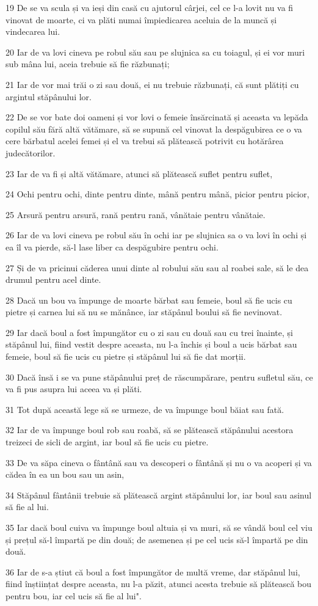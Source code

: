 \par 19 De se va scula și va ieși din casă cu ajutorul cârjei, cel ce l-a lovit nu va fi vinovat de moarte, ci va plăti numai împiedicarea aceluia de la muncă și vindecarea lui.
\par 20 Iar de va lovi cineva pe robul său sau pe slujnica sa cu toiagul, și ei vor muri sub mâna lui, aceia trebuie să fie răzbunați;
\par 21 Iar de vor mai trăi o zi sau două, ei nu trebuie răzbunați, că sunt plătiți cu argintul stăpânului lor.
\par 22 De se vor bate doi oameni și vor lovi o femeie însărcinată și aceasta va lepăda copilul său fără altă vătămare, să se supună cel vinovat la despăgubirea ce o va cere bărbatul acelei femei și el va trebui să plătească potrivit cu hotărârea judecătorilor.
\par 23 Iar de va fi și altă vătămare, atunci să plătească suflet pentru suflet,
\par 24 Ochi pentru ochi, dinte pentru dinte, mână pentru mână, picior pentru picior,
\par 25 Arsură pentru arsură, rană pentru rană, vânătaie pentru vânătaie.
\par 26 Iar de va lovi cineva pe robul său în ochi iar pe slujnica sa o va lovi în ochi și ea îl va pierde, să-l lase liber ca despăgubire pentru ochi.
\par 27 Și de va pricinui căderea unui dinte al robului său sau al roabei sale, să le dea drumul pentru acel dinte.
\par 28 Dacă un bou va împunge de moarte bărbat sau femeie, boul să fie ucis cu pietre și carnea lui să nu se mănânce, iar stăpânul boului să fie nevinovat.
\par 29 Iar dacă boul a fost împungător cu o zi sau cu două sau cu trei înainte, și stăpânul lui, fiind vestit despre aceasta, nu l-a închis și boul a ucis bărbat sau femeie, boul să fie ucis cu pietre și stăpânul lui să fie dat morții.
\par 30 Dacă însă i se va pune stăpânului preț de răscumpărare, pentru sufletul său, ce va fi pus asupra lui aceea va și plăti.
\par 31 Tot după această lege să se urmeze, de va împunge boul băiat sau fată.
\par 32 Iar de va împunge boul rob sau roabă, să se plătească stăpânului acestora treizeci de sicli de argint, iar boul să fie ucis cu pietre.
\par 33 De va săpa cineva o fântână sau va descoperi o fântână și nu o va acoperi și va cădea în ea un bou sau un asin,
\par 34 Stăpânul fântânii trebuie să plătească argint stăpânului lor, iar boul sau asinul să fie al lui.
\par 35 Iar dacă boul cuiva va împunge boul altuia și va muri, să se vândă boul cel viu și prețul să-l împartă pe din două; de asemenea și pe cel ucis să-l împartă pe din două.
\par 36 Iar de s-a știut că boul a fost împungător de multă vreme, dar stăpânul lui, fiind înștiințat despre aceasta, nu l-a păzit, atunci acesta trebuie să plătească bou pentru bou, iar cel ucis să fie al lui".

